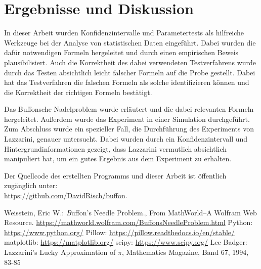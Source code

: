 \documentclass[10pt,twocolumn]{scrartcl}
\begin{document}
	
\section{Ergebnisse und Diskussion}
	In dieser Arbeit wurden Konfidenzintervalle und  Parametertests als hilfreiche Werkzeuge bei der Analyse von statistischen Daten eingeführt. Dabei wurden die dafür notwendigen Formeln hergeleitet und durch einen empirischen Beweis plausibilisiert.
	Auch die Korrektheit des dabei verwendeten Testverfahrens wurde durch das Testen absichtlich leicht falscher Formeln auf die Probe gestellt. Dabei hat das Testverfahren die falschen Formeln als solche identifizieren können und die Korrektheit der richtigen Formeln bestätigt.
	
	Das Buffonsche Nadelproblem wurde erläutert und die dabei relevanten Formeln hergeleitet. Außerdem wurde das Experiment in einer Simulation durchgeführt.
	Zum Abschluss wurde ein spezieller Fall, die Durchführung des Experiments von Lazzarini, genauer untersucht. Dabei wurden durch ein Konfidenzintervall und Hintergrundinformationen gezeigt, dass Lazzarini vermutlich absichtlich manipuliert hat, um ein gutes Ergebnis aus dem Experiment zu erhalten.
	
	\bigskip
	\noindent
	Der Quellcode des erstellten Programms und dieser Arbeit ist öffentlich zugänglich unter:\\ \url{https://github.com/DavidRisch/buffon}.

\begin{thebibliography}{99}
	Weisstein, Eric W.: {\textit Buffon's Needle Problem.}, From MathWorld--A Wolfram Web Resource. \url{https://mathworld.wolfram.com/BuffonsNeedleProblem.html}
	Python: \url{https://www.python.org/}
	Pillow: \url{https://pillow.readthedocs.io/en/stable/}
	matplotlib: \url{https://matplotlib.org/}
	scipy: \url{https://www.scipy.org/}
	Lee Badger: Lazzarini’s Lucky Approximation of $\pi$, Mathematics Magazine, Band 67, 1994, 83-85
\end{thebibliography}
\end{document}
